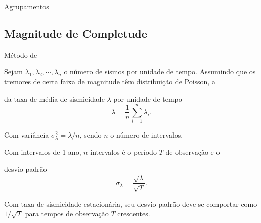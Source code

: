 \documentclass[ucs,8pt]{beamer}
\begin{document}
\begin{frame}{Agrupamentos}
\begin{figure}[H]
\begin{subfigure}[t]{0.50\textwidth}
			\label{fig:br_decluster}
    \end{subfigure}%
	\label{fig:eq_decluster}
\end{figure}
\end{frame}



\subsection{Magnitude de Completude}

\begin{frame}{Método de \citet{stepp_1971}}

Sejam $\lambda_1, \lambda_2, \cdots, \lambda_n$ o número de sismos por unidade de tempo.
\vspace{0.3cm}
Assumindo que os tremores de certa faixa de magnitude têm distribuição de Poisson, a
	\begin{block}{da taxa de média de sismicidade $\lambda$ por unidade de tempo}
		\begin{equation}
			\ensuremath{
				\lambda =  \frac{1}{n}\sum_{i=1}^{n} \lambda_i.
			}
		\label{eq:mwaf}
		\end{equation}
	\end{block}
    Com variância $\sigma_{\lambda}^2 =  \lambda/n$, sendo $n$ o número de intervalos.
	\vspace{0.3cm}

	Com intervalos de 1 ano, $n$ intervalos é o período $T$ de observação e o 
	\begin{block}{desvio padrão}
		\begin{equation}
			\ensuremath{
				 \sigma_{\lambda} = \frac{\sqrt{\lambda}}{\sqrt{T}}.
			}
		\label{eq:mwaf}
		\end{equation}
	\end{block}

	\vspace{0.3cm}
	Com taxa de sismicidade estacionária, seu desvio padrão deve se comportar como $1/\sqrt{T}$ para 
tempos de observação $T$ crescentes.

\end{frame}
\end{document}
